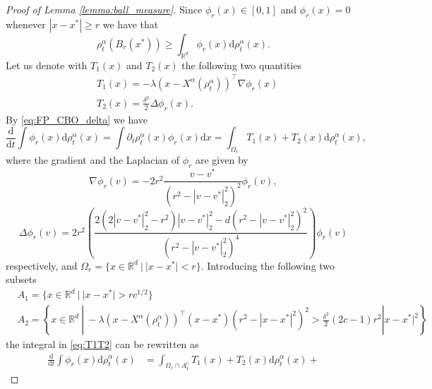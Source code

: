 \documentclass[10pt,a4paper]{amsart}
\newcommand{\R}{\mathbb{R}}
\newcommand{\Xalpha}{{X^\alpha}}
\newcommand{\diff}{\mathrm{d}}
\begin{document}
\begin{proof}[Proof of Lemma \ref{lemma:ball_measure}]
Since $\phi_r(x)\in[0,1]$ and $\phi_r(x)=0$ whenever $ |x-x^*|\geq r$ we have that 
$$\rho^\alpha_t(B_r(x^*)) \geq \int_{\mathbb{R}^d}\phi_r(x) \diff\rho^\alpha_t(x).$$
Let us denote with $T_1(x)$ and $T_2(x)$ the following two quantities
\begin{equation*}
    \begin{aligned}
        &T_1(x) = -\lambda(x-\Xalpha(\rho^\alpha_t))^\top\nabla\phi_r(x)\\
        &T_2(x) = \frac{\delta^2}{2}\Delta\phi_r(x).
    \end{aligned}
\end{equation*}
By \eqref{eq:FP_CBO_delta} we have 
\begin{equation}\label{eq:T1T2}
    \frac{\diff}{\diff t}\int\phi_r(x)\diff\rho^\alpha_t(x) = \int\partial_t\rho^\alpha_t(x)\phi_r(x)\diff x = \int_{\Omega_r} T_1(x)+T_2(x)\diff\rho^\alpha_t(x),
\end{equation}
where the gradient and the Laplacian of $\phi_r$ are given by 
    $$
\nabla \phi_r(v) = -2r^2 \frac{v - v^*}{\left( r^2 - |v - v^*|_2^2 \right)^2} \phi_r(v),
$$
$$
\Delta \phi_r(v) = 2r^2 \left( \frac{2 \left( 2|v - v^*|_2^2 - r^2 \right)|v - v^*|_2^2 - d \left( r^2 - |v - v^*|_2^2 \right)^2}{\left( r^2 - |v - v^*|_2^2 \right)^4} \right) \phi_r(v)
$$
respectively, and $\Omega_r= \{x\in\R^d\ |\  |x-x^*|<r\}$. Introducing the following two subsets 
\begin{equation*}
    \begin{aligned}
        &A_1 = \{x\in\R^d\ | \  |x-x^*|> rc^{1/2}\}\\
        &A_2 = \left\{x\in\R^d\ | \ -\lambda(x-\Xalpha(\rho^\alpha_t))^\top(x-x^*)\left(r^2- |x-x^*|^2\right)^2>\frac{\delta^2}{2}(2c-1)r^2 |x-x^*|^2\right\}
    \end{aligned}
\end{equation*}
the integral in \eqref{eq:T1T2} can be rewritten as
\begin{equation}\begin{aligned}
    \frac{\diff}{\diff t}\int\phi_r(x)\diff\rho^\alpha_t(x) &=
    \int_{\Omega_r\cap A_1^c} T_1(x)+T_2(x)\diff\rho^\alpha_t(x) +

\end{aligned}
\end{equation}
\end{proof}
\end{document}
